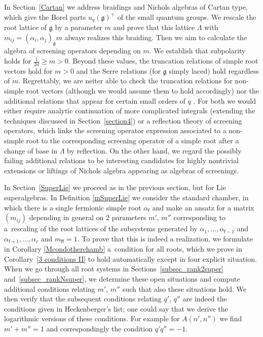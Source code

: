 \documentclass[10pt,a4paper]{amsart}
\numberwithin{equation}{section}
\newcommand{\g}{\mathfrak{g}}
\newcommand{\f}{\mathsf{f}}
\begin{document}
In Section~\ref{Cartan} we address braidings and Nichols algebras of Cartan type, which give the Borel parts $u_q(\g)^+$ of the small quantum groups. We rescale the root lattice of $\g$ by a parameter $m$ and prove that this lattice $\Lambda$ with $m_{ij}=(\alpha_i,\alpha_j)_\g m$ always realizes this braiding. Then we aim to calculate the algebra of screening operators depending on $m$. We establish that subpolarity holds for $\frac{1}{2d}\geq m>0$. Beyond these values, the truncation relations of simple root vectors hold for $m>0$ and the Serre relations (for $\g$ simply laced) hold regardless of $m$. Regrettably, we are neiter able to check the truncation relations for non-simple root vectors (although we would assume them to hold accordingly) nor the additional relations that appear for certain small orders of $q$ \cite{AA17}. For both we would either require analytic continuation of more complicated integrals (extending the techniques discussed in Section~\ref{section4}) or a reflection theory of screening operators, which links the screening operator expression associated to a non-simple root to the corresponding screening operator of a simple root after a change of base in $\Lambda$ by reflection. On the other hand, we regard the possibly failing additional relations to be interesting candidates for highly nontrivial extensions or liftings of Nichols algebra appearing as algebras of screenings.

In Section~\ref{SuperLie} we proceed as in the previous section, but for Lie superalgebras. In Definition \ref{mSuperLie} we consider the standard chamber, in which there is a single fermionic simple root $\alpha_{\f}$ and make an ansatz for a matrix $(m_{ij})$ depending in general on $2$ parameters $m'$, $m''$ corresponding to a~rescaling of the root lattices of the subsystems generated by $\alpha_1,\dots, \alpha_{\f-1}$ and $\alpha_{\f+1},\dots,\alpha_r$ and ${m_{\f\f}=1}$. To prove that this is indeed a realization, we formulate in Corollary \ref{Mcondotherchamb} a~condition for all roots, which we prove in Corollary~\ref{3 conditions II} to hold automatically except in four explicit situation. When we go through all root systems in Sections~\ref{subsec_rank2super} and~\ref{subsec_rankNsuper}, we determine these open situations and compute additional conditions relating $m'$, $m''$ such that also these situations hold. We then verify that the subsequent conditions relating $q'$, $q''$ are indeed the conditions given in Heckenberger's list; one could say that we derive the logarithmic versions of these conditions. For example for $A(n',n'')$ we find $m'+m''=1$ and correspondingly the condition $q'q''=-1$.
\end{document}
